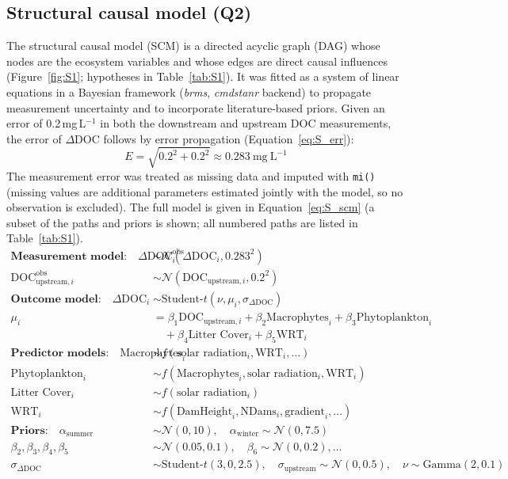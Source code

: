 \documentclass[11pt,a4paper]{article}
\begin{document}
\subsection*{Structural causal model (Q2)}

The structural causal model (SCM) is a directed acyclic graph (DAG) whose nodes are the ecosystem variables and whose edges are direct causal influences (Figure~\ref{fig:S1}; hypotheses in Table~\ref{tab:S1}). It was fitted as a system of linear equations in a Bayesian framework (\emph{brms}, \emph{cmdstanr} backend) to propagate measurement uncertainty and to incorporate literature-based priors. Given an error of 0.2\,mg\,L$^{-1}$ in both the downstream and upstream DOC measurements, the error of $\Delta$DOC follows by error propagation (Equation~\ref{eq:S_err}):
\begin{equation}
E = \sqrt{0.2^{2} + 0.2^{2}} \approx 0.283\ \text{mg}\ \text{L}^{-1}
\label{eq:S_err}
\end{equation}
The measurement error was treated as missing data and imputed with \texttt{mi()} (missing values are additional parameters estimated jointly with the model, so no observation is excluded). The full model is given in Equation~\ref{eq:S_scm} (a subset of the paths and priors is shown; all numbered paths are listed in Table~\ref{tab:S1}).
\begin{equation}
\begin{aligned}
\textbf{Measurement model:} \quad
\Delta \text{DOC}_i^{\text{obs}} &\sim \mathcal{N}(\Delta \text{DOC}_i, 0.283^2) \\
\text{DOC}_{\text{upstream},i}^{\text{obs}} &\sim \mathcal{N}(\text{DOC}_{\text{upstream},i}, 0.2^2) \\[0.5em]
\textbf{Outcome model:} \quad
\Delta \text{DOC}_i &\sim \text{Student-}t(\nu, \mu_i, \sigma_{\Delta \text{DOC}}) \\
\mu_i &= \beta_1 \text{DOC}_{\text{upstream}, i} + \beta_2 \text{Macrophytes}_i + \beta_3 \text{Phytoplankton}_i \\
&\quad + \beta_4 \text{Litter Cover}_i + \beta_5 \text{WRT}_i \\[0.5em]
\textbf{Predictor models:} \quad
\text{Macrophytes}_i &\sim f(\text{solar radiation}_i, \text{WRT}_i, \dots) \\
\text{Phytoplankton}_i &\sim f(\text{Macrophytes}_i, \text{solar radiation}_i, \text{WRT}_i) \\
\text{Litter Cover}_i &\sim f(\text{solar radiation}_i) \\
\text{WRT}_i &\sim f(\text{DamHeight}_i, \text{NDams}_i, \text{gradient}_i, \dots) \\[0.5em]
\textbf{Priors:} \quad
\alpha_{\text{summer}} &\sim \mathcal{N}(0, 10), \quad \alpha_{\text{winter}} \sim \mathcal{N}(0, 7.5) \\
\beta_2, \beta_3, \beta_4, \beta_5 &\sim \mathcal{N}(0.05, 0.1), \quad \beta_6 \sim \mathcal{N}(0, 0.2), \dots \\
\sigma_{\Delta \text{DOC}} &\sim \text{Student-}t(3, 0, 2.5), \quad
\sigma_{\text{upstream}} \sim \mathcal{N}(0, 0.5), \quad
\nu \sim \text{Gamma}(2, 0.1)
\end{aligned}
\label{eq:S_scm}
\end{equation}
\end{document}
